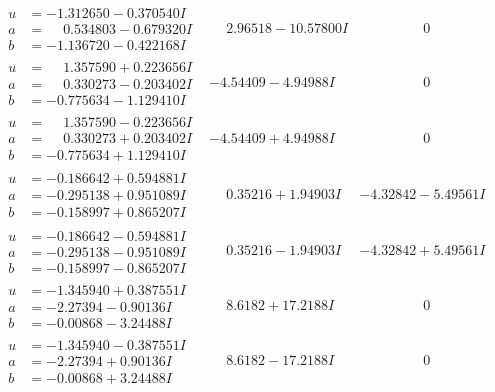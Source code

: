 \documentclass[1p]{elsarticle_modified}
\theoremstyle{definition}
\begin{document}
$$\begin{array}{c|c|c}
\begin{aligned}
u &= -1.312650 - 0.370540 I \\
a &= \phantom{-}0.534803 - 0.679320 I \\
b &= -1.136720 - 0.422168 I\end{aligned}
 & \phantom{-}2.96518 - 10.57800 I & \phantom{-0.000000 } 0 \\ \hline\begin{aligned}
u &= \phantom{-}1.357590 + 0.223656 I \\
a &= \phantom{-}0.330273 - 0.203402 I \\
b &= -0.775634 - 1.129410 I\end{aligned}
 & -4.54409 - 4.94988 I & \phantom{-0.000000 } 0 \\ \hline\begin{aligned}
u &= \phantom{-}1.357590 - 0.223656 I \\
a &= \phantom{-}0.330273 + 0.203402 I \\
b &= -0.775634 + 1.129410 I\end{aligned}
 & -4.54409 + 4.94988 I & \phantom{-0.000000 } 0 \\ \hline\begin{aligned}
u &= -0.186642 + 0.594881 I \\
a &= -0.295138 + 0.951089 I \\
b &= -0.158997 + 0.865207 I\end{aligned}
 & \phantom{-}0.35216 + 1.94903 I & -4.32842 - 5.49561 I \\ \hline\begin{aligned}
u &= -0.186642 - 0.594881 I \\
a &= -0.295138 - 0.951089 I \\
b &= -0.158997 - 0.865207 I\end{aligned}
 & \phantom{-}0.35216 - 1.94903 I & -4.32842 + 5.49561 I \\ \hline\begin{aligned}
u &= -1.345940 + 0.387551 I \\
a &= -2.27394 - 0.90136 I \\
b &= -0.00868 - 3.24488 I\end{aligned}
 & \phantom{-}8.6182 + 17.2188 I & \phantom{-0.000000 } 0 \\ \hline\begin{aligned}
u &= -1.345940 - 0.387551 I \\
a &= -2.27394 + 0.90136 I \\
b &= -0.00868 + 3.24488 I\end{aligned}
 & \phantom{-}8.6182 - 17.2188 I & \phantom{-0.000000 } 0 \\ \hline\begin{aligned}

\end{aligned}
\end{array}$$
\end{document}
